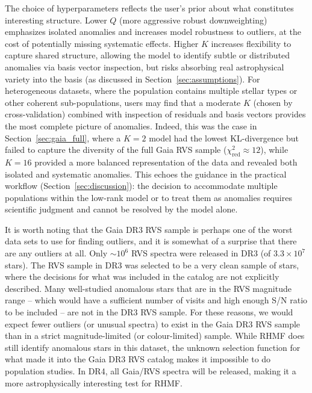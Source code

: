 \documentclass[onecolumn,floatfix,linenumbers,trackchanges]{aastex631}
\begin{document}
The choice of hyperparameters reflects the user's prior about what constitutes interesting structure. Lower $Q$ (more aggressive robust downweighting) emphasizes isolated anomalies and increases model robustness to outliers, at the cost of potentially missing systematic effects. Higher $K$ increases flexibility to capture shared structure, allowing the model to identify subtle or distributed anomalies via basis vector inspection, but risks absorbing real astrophysical variety into the basis (as discussed in Section~\ref{sec:assumptions}). For heterogeneous datasets, where the population contains multiple stellar types or other coherent sub-populations, users may find that a moderate $K$ (chosen by cross-validation) combined with inspection of residuals and basis vectors provides the most complete picture of anomalies. Indeed, this was the case in Section~\ref{sec:gaia_full}, where a $K=2$ model had the lowest KL-divergence but failed to capture the diversity of the full Gaia RVS sample ($\chi_\textrm{red}^2 \approx 12$), while $K=16$ provided a more balanced representation of the data and revealed both isolated and systematic anomalies. This echoes the guidance in the practical workflow (Section~\ref{sec:discussion}): the decision to accommodate multiple populations within the low-rank model or to treat them as anomalies requires scientific judgment and cannot be resolved by the model alone.

It is worth noting that the Gaia DR3 RVS sample is perhaps one of the worst data sets to use for finding outliers, and it is somewhat of a surprise that there are any outliers at all. Only $\sim$$10^6$ RVS spectra were released in DR3 (of $3.3 \times 10^7$ stars). The RVS sample in DR3 was selected to be a very clean sample of stars, where the decisions for what was included in the catalog are not explicitly described. Many well-studied anomalous stars that are in the RVS magnitude range -- which would have a sufficient number of visits and high enough S/N ratio to be included -- are not in the DR3 RVS sample. For these reasons, we would expect fewer outliers (or unusual spectra) to exist in the Gaia DR3 RVS sample than in a strict magnitude-limited (or colour-limited) sample. While RHMF does still identify anomalous stars in this dataset, the unknown selection function for what made it into the Gaia DR3 RVS catalog makes it impossible to do population studies. In DR4, all Gaia/RVS spectra will be released, making it a more astrophysically interesting test for RHMF.

\end{document}

